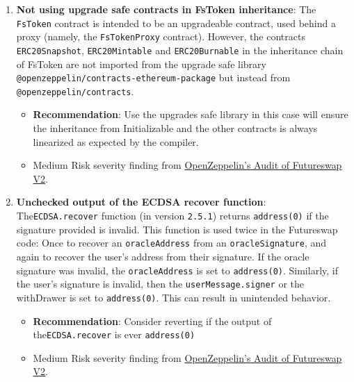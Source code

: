 \begin{enumerate}
\item\textbf{Not using upgrade safe contracts in FsToken inheritance}: The \verb|FsToken| contract is intended to be an upgradeable contract, used behind a proxy (namely, the \verb|FsTokenProxy| contract). However, the contracts \verb|ERC20Snapshot|, \verb|ERC20Mintable| and \verb|ERC20Burnable| in the inheritance chain of FsToken are not imported from the upgrade safe library \verb|@openzeppelin/contracts-ethereum-package| but instead from \verb|@openzeppelin/contracts|.
	\begin{itemize}
	\item\textbf{Recommendation}: Use the upgrades safe library in this case will ensure the inheritance from Initializable and the other contracts is always linearized as expected by the compiler.
	\item Medium Risk severity finding from \href{https://blog.openzeppelin.com/futureswap-v2-audit/}{OpenZeppelin’s Audit of Futureswap V2}.
	\end{itemize}

\item\textbf{Unchecked output of the ECDSA recover function}: The\linebreak\verb|ECDSA.recover| function (in version \verb|2.5.1|) returns \verb|address(0)| if the signature provided is invalid. This function is used twice in the Futureswap code: Once to recover an \verb|oracleAddress| from an \verb|oracleSignature|, and again to recover the user’s address from their signature. If the oracle signature was invalid, the \verb|oracleAddress| is set to \verb|address(0)|. Similarly, if the user’s signature is invalid, then the \verb|userMessage.signer| or the withDrawer is set to \verb|address(0)|. This can result in unintended behavior.
	\begin{itemize}
	\item\textbf{Recommendation}: Consider reverting if the output of the\linebreak\verb|ECDSA.recover| is ever \verb|address(0)|
	\item Medium Risk severity finding from \href{https://blog.openzeppelin.com/futureswap-v2-audit/}{OpenZeppelin’s Audit of Futureswap V2}.
	\end{itemize}


\end{enumerate}
